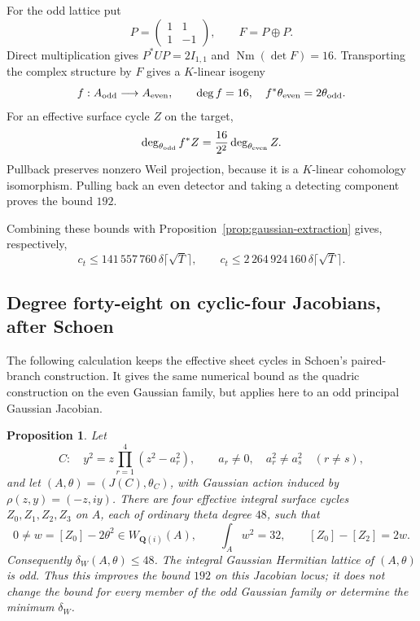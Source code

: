 \documentclass[11pt]{article}
\newtheorem{proposition}[theorem]{Proposition}
\theoremstyle{definition}
\theoremstyle{remark}
\newcommand{\Nm}{\operatorname{Nm}}
\begin{document}
For the odd lattice put
\[
 P=\begin{pmatrix}1&1\\1&-1\end{pmatrix},\qquad F=P\oplus P.
\]
Direct multiplication gives $P^*UP=2I_{1,1}$ and $\Nm(\det F)=16$. Transporting the complex structure by $F$ gives a $K$-linear isogeny
\[
 f:A_{\rm odd}\longrightarrow A_{\rm even},\qquad
 \deg f=16,\quad f^*\theta_{\rm even}=2\theta_{\rm odd}.
\]
For an effective surface cycle $Z$ on the target,
\[
 \deg_{\theta_{\rm odd}} f^*Z
 =\frac{16}{2^2}\deg_{\theta_{\rm even}}Z.
\]
Pullback preserves nonzero Weil projection, because it is a $K$-linear cohomology isomorphism. Pulling back an even detector and taking a detecting component proves the bound $192$.

Combining these bounds with Proposition~\ref{prop:gaussian-extraction} gives, respectively,
\[
 c_t\leq141\,557\,760\,\delta\lceil\sqrt T\rceil,
 \qquad
 c_t\leq2\,264\,924\,160\,\delta\lceil\sqrt T\rceil.
\]

\subsection{Degree forty-eight on cyclic-four Jacobians, after Schoen}
\label{sec:cyclic-four-degree}

The following calculation keeps the effective sheet cycles in Schoen's
paired-branch construction.  It gives the same numerical bound as the
quadric construction on the even Gaussian family, but applies here to an
odd principal Gaussian Jacobian.

\begin{proposition}\label{prop:cyclic-four-degree}
Let
\[
 C:\quad y^2=z\prod_{r=1}^4(z^2-a_r^2),\qquad
 a_r\ne0,\quad a_r^2\ne a_s^2\quad(r\ne s),
\]
and let $(A,\theta)=(J(C),\theta_C)$, with Gaussian action induced by
$\rho(z,y)=(-z,iy)$.  There are four effective integral surface cycles
$Z_0,Z_1,Z_2,Z_3$ on $A$, each of ordinary theta degree $48$, such that
\[
 0\ne w=[Z_0]-2\theta^2\in W_{\mathbf Q(i)}(A),
 \qquad \int_A w^2=32,
 \qquad [Z_0]-[Z_2]=2w.
\]
Consequently $\delta_W(A,\theta)\le48$.  The integral Gaussian Hermitian
lattice of $(A,\theta)$ is odd.  Thus this improves the bound $192$
on this Jacobian locus; it does not change the bound for every member of
the odd Gaussian family or determine the minimum $\delta_W$.
\end{proposition}
\end{document}
